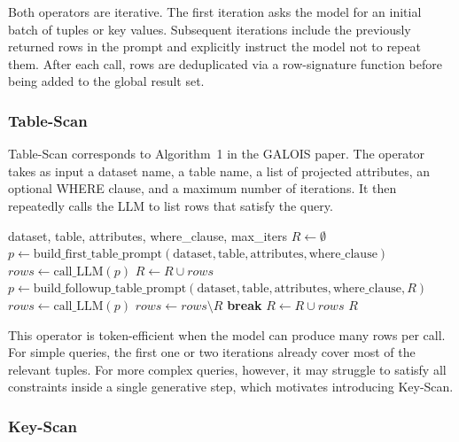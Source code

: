 \documentclass[11pt]{article}
\begin{document}
Both operators are iterative. The first iteration asks the model for an initial batch of
tuples or key values. Subsequent iterations include the previously returned rows in the
prompt and explicitly instruct the model not to repeat them. After each call, rows are
deduplicated via a row-signature function before being added to the global result set.

\subsubsection{Table-Scan}

Table-Scan corresponds to Algorithm~1 in the GALOIS paper. The operator takes as
input a dataset name, a table name, a list of projected attributes, an optional WHERE
clause, and a maximum number of iterations. It then repeatedly calls the LLM to list
rows that satisfy the query.

\begin{algorithm}[h]
  \caption{Table-Scan}
  \label{alg:tablescan}
  \begin{algorithmic}[1]
    \Require dataset, table, attributes, where\_clause, max\_iters
    \State $R \gets \emptyset$ 
    \State $p \gets \text{build\_first\_table\_prompt}(\text{dataset}, \text{table}, \text{attributes}, \text{where\_clause})$
    \State $rows \gets \text{call\_LLM}(p)$
    \State $R \gets R \cup rows$
      \State $p \gets \text{build\_followup\_table\_prompt}(\text{dataset}, \text{table}, \text{attributes}, \text{where\_clause}, R)$
      \State $rows \gets \text{call\_LLM}(p)$
      \State $rows \gets rows \setminus R$ 
        \State \textbf{break}
      \EndIf
      \State $R \gets R \cup rows$
    \EndFor
    \State \Return $R$
  \end{algorithmic}
\end{algorithm}

This operator is token-efficient when the model can produce many rows per call. For
simple queries, the first one or two iterations already cover most of the relevant tuples.
For more complex queries, however, it may struggle to satisfy all constraints inside a
single generative step, which motivates introducing Key-Scan.

\subsubsection{Key-Scan}
\end{document}
